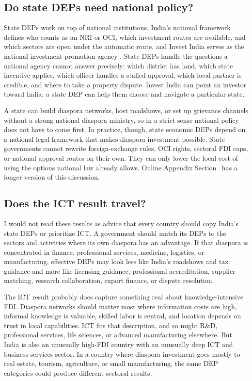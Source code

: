 \documentclass[12pt]{article}
\begin{document}
\subsection{Do state DEPs need national policy?}

State DEPs work on top of national institutions. India's national framework defines who counts as an NRI or OCI, which investment routes are available, and which sectors are open under the automatic route, and Invest India serves as the national investment promotion agency \citep{maximize_india_with_maximum_world_about_nodate}. State DEPs handle the questions a national agency cannot answer precisely: which district has land, which state incentive applies, which officer handles a stalled approval, which local partner is credible, and where to take a property dispute. Invest India can point an investor toward India; a state DEP can help them choose and navigate a particular state.

A state can build diaspora networks, host roadshows, or set up grievance channels without a strong national diaspora ministry, so in a strict sense national policy does not have to come first. In practice, though, state economic DEPs depend on a national legal framework that makes diaspora investment possible. State governments cannot rewrite foreign-exchange rules, OCI rights, sectoral FDI caps, or national approval routes on their own. They can only lower the local cost of using the options national law already allows. Online Appendix Section~ has a longer version of this discussion.

\subsection{Does the ICT result travel?}

I would not read these results as advice that every country should copy India's state DEPs or prioritize ICT. A government should match its DEPs to the sectors and activities where its own diaspora has an advantage. If that diaspora is concentrated in finance, professional services, medicine, logistics, or manufacturing, effective DEPs may look less like India's roadshows and tax guidance and more like licensing guidance, professional accreditation, supplier matching, research collaboration, export finance, or dispute resolution.

The ICT result probably does capture something real about knowledge-intensive FDI. Diaspora networks should matter most where information costs are high, informal knowledge is valuable, skilled labor is central, and location depends on trust in local capabilities. ICT fits that description, and so might R\&D, professional services, life sciences, or advanced manufacturing elsewhere. But India is also an unusually high-FDI country with an unusually deep ICT and business-services sector. In a country where diaspora investment goes mostly to real estate, tourism, agriculture, or small manufacturing, the same DEP categories could produce different sectoral results.
\end{document}
